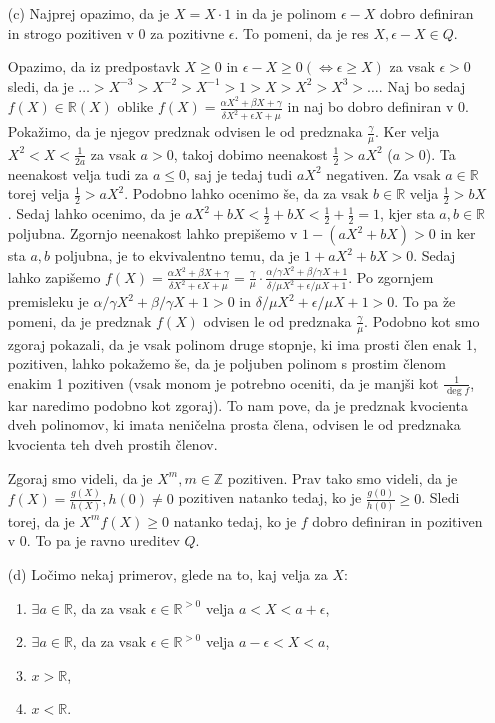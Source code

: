 \documentclass[a4paper, 12pt]{article}
\newcommand{\Z}{\mathbb{Z}}
\newcommand{\R}{\mathbb{R}}
\begin{document}
\begin{enumerate}
\item[(c)] Najprej opazimo, da je $X=X\cdot 1$ in da je polinom $\epsilon - X$ dobro definiran in strogo pozitiven v 0 za pozitivne $\epsilon$. To pomeni, da je res $X, \epsilon - X \in Q$.

Opazimo, da iz predpostavk $X\ge 0$ in $\epsilon - X \ge 0 (\Leftrightarrow \epsilon \ge X)$ za vsak $\epsilon > 0$ sledi, da je $\dots > X^{-3} > X^{-2} > X^{-1} > 1 > X > X^2 > X^3> \dots $. Naj bo sedaj $f(X)  \in \R(X)$ oblike $f(X) = \frac{\alpha X^2 + \beta X + \gamma}{\delta X^2 + \epsilon X +\mu}$ in naj bo dobro definiran v 0. Pokažimo, da je njegov predznak odvisen le od predznaka $\frac{\gamma}{\mu}$. Ker velja $X^2 < X < \frac{1}{2a}$ za vsak $a>0$, takoj dobimo neenakost $\frac{1}{2} > aX^2$ ($a>0$). Ta neenakost velja tudi za $a\le 0$, saj je tedaj tudi $aX^2$ negativen. Za vsak $a\in \R$ torej velja $\frac{1}{2} > aX^2$. Podobno lahko ocenimo še, da za vsak $b\in \R$ velja $\frac{1}{2} > bX$. Sedaj lahko ocenimo, da je $aX^2 + bX < \frac{1}{2} + bX < \frac{1}{2} + \frac{1}{2} = 1$, kjer sta $a,b\in \R$ poljubna. Zgornjo neenakost lahko prepišemo v $1 - (aX^2 + bX) > 0$ in ker sta $a,b$ poljubna, je to ekvivalentno temu, da je $1 + aX^2 + bX > 0$. 
Sedaj lahko zapišemo $f(X) = \frac{\alpha X^2 + \beta X + \gamma}{\delta X^2 + \epsilon X +\mu} = \frac{\gamma}{\mu} \cdot  \frac{\alpha/\gamma X^2 + \beta/\gamma X + 1}{\delta/\mu X^2 + \epsilon/\mu X +1}$. Po zgornjem premisleku je  $\alpha/\gamma X^2 + \beta/\gamma X + 1>0$ in $ \delta/\mu X^2 + \epsilon/\mu X +1>0 $. To pa že pomeni, da je predznak $f(X)$ odvisen le od predznaka $\frac{\gamma}{\mu}$. Podobno kot smo zgoraj pokazali, da je vsak polinom druge stopnje, ki ima prosti člen enak 1, pozitiven, lahko pokažemo še, da je poljuben polinom s prostim členom enakim 1 pozitiven (vsak monom je potrebno oceniti, da je manjši kot $\frac{1}{\deg f}$, kar naredimo podobno kot zgoraj). To nam pove, da je predznak kvocienta dveh polinomov, ki imata neničelna prosta člena, odvisen le od predznaka kvocienta teh dveh prostih členov. 

Zgoraj smo videli, da je $X^m, m\in \Z$ pozitiven. Prav tako smo videli, da je $f(X) = \frac{g(X)}{h(X)}, h(0) \neq 0$ pozitiven natanko tedaj, ko je $\frac{g(0)}{h(0)} \ge 0$. Sledi torej, da je $X^m f(X) \ge 0$ natanko tedaj, ko je $f$ dobro definiran in pozitiven v 0. To pa je ravno ureditev $Q$.

\item[(d)] Ločimo nekaj primerov, glede na to, kaj velja za $X$:
\begin{enumerate}
\item $\exists a \in \R$, da za vsak $\epsilon \in \R^{>0}$ velja $a < X < a+ \epsilon$,
\item $\exists a \in \R$, da za vsak $\epsilon \in \R^{>0}$ velja $a-\epsilon < X < a$,
\item $x>\R$,
\item $x<\R$.
\end{enumerate}


\end{enumerate}
\end{document}
